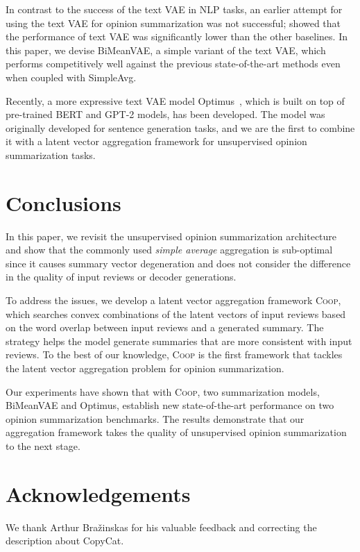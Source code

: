 \documentclass[11pt]{article}
\newcommand{\aggname}{\textsc{Coop}}
\newcommand{\name}{\mbox{\sc BiMeanVAE}}
\newcommand{\simpleavg}{\mbox{SimpleAvg}}
\newcommand{\hl}[1]{#1}
\begin{document}
In contrast to the success of the text VAE in NLP tasks, an earlier attempt for using the text VAE for opinion summarization was not successful; \citet{brazinskas-etal-2020-unsupervised} showed that the performance of text VAE was significantly lower than the other baselines.
In this paper, \hl{we devise \name{},} a simple variant of the text VAE\hl{, which} 
performs competitively well against the previous state-of-the-art methods \hl{even when coupled with \simpleavg.}

Recently, a more expressive text VAE model Optimus~\cite{li-etal-2020-optimus}, which is built on top of pre-trained BERT and GPT-2 models, has been developed. The model was originally developed for sentence generation tasks, and we are the first to combine it with a latent vector aggregation framework for unsupervised opinion summarization tasks.

\section{Conclusions}
In this paper, we revisit the unsupervised opinion summarization architecture and show that the commonly used {\em simple average} aggregation is sub-optimal since it \hl{causes summary vector degeneration and} does not consider the difference in the quality of input reviews or decoder generations.

To address the issues, we develop a latent \hl{vector} aggregation framework \aggname, which searches convex combinations of the latent \hl{vectors} of input reviews based on the word overlap between input reviews and a generated summary. The strategy helps the model generate summaries that are more consistent with input reviews.
To the best of our knowledge, \aggname{} is the first framework that tackles the latent \hl{vector} aggregation problem for opinion summarization.

Our experiments have shown that with \aggname{}, two summarization models, \name{} and Optimus, establish new state-of-the-art performance on two opinion summarization benchmarks. The results demonstrate that our aggregation framework takes the quality of unsupervised opinion summarization to the next stage.

\section*{Acknowledgements}
We thank Arthur Bra{\v{z}}inskas for his valuable feedback and correcting the description about CopyCat.
\end{document}
